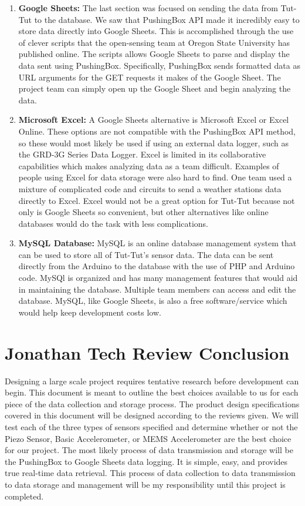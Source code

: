 \documentclass[letterpaper,10pt,draftclsnofoot,onecolumn]{article}
\begin{document}
\begin{enumerate}
    \item \textbf{Google Sheets:} The last section was focused on sending the data from Tut-Tut to the database. We saw that PushingBox API made it incredibly easy to store data directly into Google Sheets. This is accomplished through the use of clever scripts that the open-sensing team at Oregon State University has published online. The scripts allows Google Sheets to parse and display the data sent using PushingBox. Specifically, PushingBox sends formatted data as URL arguments for the GET requests it makes of the Google Sheet. \cite{realtimepushingbox} The project team can simply open up the Google Sheet and begin analyzing the data.
    \item \textbf{Microsoft Excel:} A Google Sheets alternative is Microsoft Excel or Excel Online. These options are not compatible with the PushingBox API method, so these would most likely be used if using an external data logger, such as the GRD-3G Series Data Logger. Excel is limited in its collaborative capabilities which makes analyzing data as a team difficult. Examples of people using Excel for data storage were also hard to find. One team used a mixture of complicated code and circuits to send a weather stations data directly to Excel. \cite{weather} Excel would not be a great option for Tut-Tut because not only is Google Sheets so convenient, but other alternatives like online databases would do the task with less complications.
    \item \textbf{MySQL Database:} MySQL is an online database management system that can be used to store all of Tut-Tut's sensor data. The data can be sent directly from the Arduino to the database with the use of PHP and Arduino code. \cite{mysql} MySQl is organized and has many management features that would aid in maintaining the database. Multiple team members can access and edit the database. MySQL, like Google Sheets, is also a free software/service which would help keep development costs low.
\end{enumerate}


\section{Jonathan Tech Review Conclusion}
Designing a large scale project requires tentative research before development can begin. This document is meant to outline the best choices available to us for each piece of the data collection and storage process. The product design specifications covered in this document will be designed according to the reviews given. We will test each of the three types of sensors specified and determine whether or not the Piezo Sensor, Basic Accelerometer, or MEMS Accelerometer are the best choice for our project. The most likely process of data transmission and storage will be the PushingBox to Google Sheets data logging. It is simple, easy, and provides true real-time data retrieval. This process of data collection to data transmission to data storage and management will be my responsibility until this project is completed.
\end{document}
